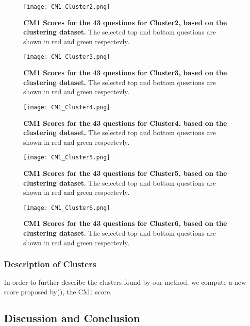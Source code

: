 \documentclass{article}
\begin{document}
\begin{figure}[h]
	\texttt{[image: CM1\_Cluster2.png]}
	\caption{\textbf{CM1 Scores for the 43 questions for Cluster2, based on the
	clustering dataset.} The selected top and bottom questions are shown in red
	and green respectevly.}
	\label{fig:Cluster2}
\end{figure}

\begin{figure}[h]
	\texttt{[image: CM1\_Cluster3.png]}
	\caption{\textbf{CM1 Scores for the 43 questions for Cluster3, based on the
	clustering dataset.} The selected top and bottom questions are shown in red
	and green respectevly.}
	\label{fig:Cluster3}
\end{figure}

\begin{figure}[h]
	\texttt{[image: CM1\_Cluster4.png]}
	\caption{\textbf{CM1 Scores for the 43 questions for Cluster4, based on the
	clustering dataset.} The selected top and bottom questions are shown in red
	and green respectevly.}
	\label{fig:Cluster4}
\end{figure}

\begin{figure}[h]
	\texttt{[image: CM1\_Cluster5.png]}
	\caption{\textbf{CM1 Scores for the 43 questions for Cluster5, based on the
	clustering dataset.} The selected top and bottom questions are shown in red
	and green respectevly.}
	\label{fig:Cluster5}
\end{figure}

\begin{figure}[h]
	\texttt{[image: CM1\_Cluster6.png]}
	\caption{\textbf{CM1 Scores for the 43 questions for Cluster6, based on the
	clustering dataset.} The selected top and bottom questions are shown in red
	and green respectevly.}
	\label{fig:Cluster6}
\end{figure}



\subsubsection{Description of Clusters}

In order to further describe the clusters found by our method, we compute a new
score proposed by(), the CM1 score.





\subsection{Discussion and Conclusion}
\end{document}
